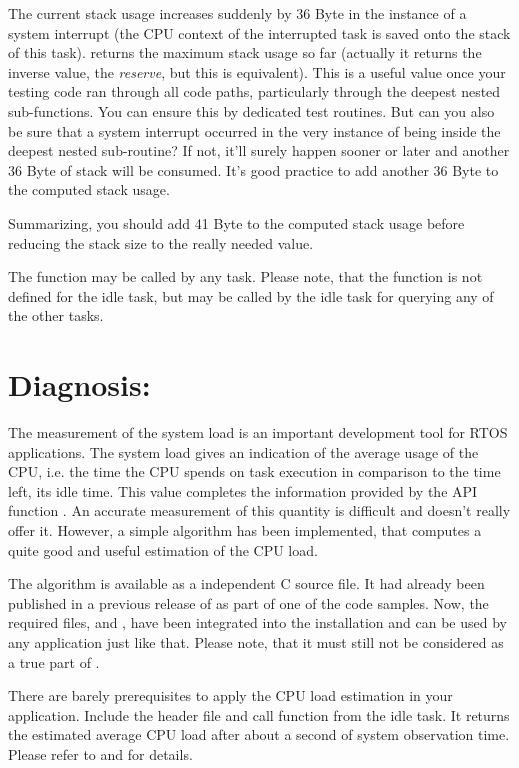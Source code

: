The current stack usage increases suddenly by 36 Byte in the instance of a
system interrupt (the CPU context of the interrupted task is saved onto
the stack of this task).  returns the maximum
stack usage so far (actually it returns the inverse value, the
\emph{reserve}, but this is equivalent). This is a useful value once your
testing code ran through all code paths, particularly through the deepest
nested sub-functions. You can ensure this by dedicated test routines. But
can you also be sure that a system interrupt occurred in the very instance
of being inside the deepest nested sub-routine? If not, it'll surely
happen sooner or later and another 36 Byte of stack will be consumed. It's
good practice to add another 36 Byte to the computed stack usage.

Summarizing, you should add 41 Byte to the computed stack usage before
reducing the stack size to the really needed value.

The function  may be called by any task.
Please note, that the function is not defined for the idle task, but may
be called by the idle task for querying any of the other tasks.


\section{Diagnosis: }

The measurement of the system load is an important development tool for
RTOS applications. The system load gives an indication of the average
usage of the CPU, i.e. the time the CPU spends on task execution in
comparison to the time left, its idle time. This value completes the
information provided by the API function
. An accurate measurement of this
quantity is difficult and \rtos{} doesn't really offer it. However, a
simple algorithm has been implemented, that computes a quite good and
useful estimation of the CPU load.

The algorithm is available as a independent C source file. It had already
been published in a previous release of \rtos{} as part of one of the code
samples. Now, the required files,  and
, have been integrated into the \rtos{} installation and
can be used by any application just like that. Please note, that it must
still not be considered as a true part of \rtos.

There are barely prerequisites to apply the CPU load estimation in your
\rtos{} application. Include the header file  and
call function  from the idle task. It returns
the estimated average CPU load after about a second of system observation
time. Please refer to  and  for
details.

